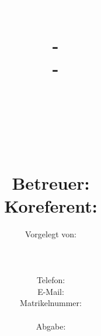 \title{%
\includegraphics[scale=0.75]{img/logo.jpg} \\
\ \\
\large \varufas \ - \vardepartment \\
\varcourseofstudies \ - \varsubjectarea\\
\varsemester\\
\varcause\\[10mm]
{\Large \vartitle}\\
\ \\
Betreuer: \varprofessor \\
Koreferent: \varcoprofessor
}

\author{%
Vorgelegt von:\\[10mm]
\varauthorprename \ \varauthorsurname\\
\varstreet \ \varstreetno\\
\varzip \ \varcity\\
Telefon: \vartel\\
E-Mail: \varmail\\
Matrikelnummer: \varmatnr\\%
\ \\
Abgabe: \varlevydate\\
}
\date{}